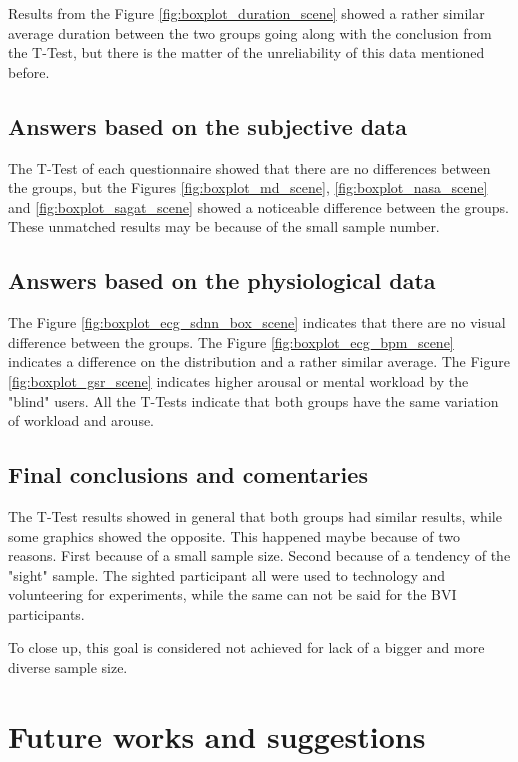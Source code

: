 Results from the Figure \ref{fig:boxplot_duration_scene} showed a rather similar average duration between the two groups going along with the conclusion from the T-Test, but there is the matter of the unreliability of this data mentioned before.

\subsection{Answers based on the subjective data}

The T-Test of each questionnaire showed that there are no differences between the groups, but the Figures \ref{fig:boxplot_md_scene}, \ref{fig:boxplot_nasa_scene} and \ref{fig:boxplot_sagat_scene} showed a noticeable difference between the groups. These unmatched results may be because of the small sample number.

\subsection{Answers based on the physiological data}

The Figure \ref{fig:boxplot_ecg_sdnn_box_scene} indicates that there are no visual difference between the groups. The Figure \ref{fig:boxplot_ecg_bpm_scene} indicates a difference on the distribution and a rather similar average. The Figure \ref{fig:boxplot_gsr_scene} indicates higher arousal or mental workload by the "blind" users. All the T-Tests indicate that both groups have the same variation of workload and arouse.

\subsection{Final conclusions and comentaries}

The T-Test results showed in general that both groups had similar results, while some graphics showed the opposite. This happened maybe because of two reasons. First because of a small sample size. Second because of a tendency of the "sight" sample. The sighted participant all were used to technology and volunteering for experiments, while the same can not be said for the BVI participants.

To close up, this goal is considered not achieved for lack of a bigger and more diverse sample size.


\section{Future works and suggestions}

